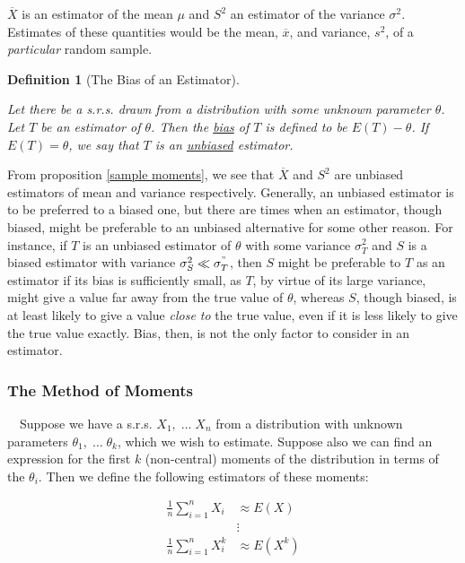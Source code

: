 \documentclass[12pt,a4paper]{article}
\newtheorem{defn}[thm]{Definition}
\begin{document}
$\overline{X}$ is an estimator of the mean $\mu$ and $S^2$ an estimator of the variance $\sigma^2$. Estimates of these quantities would be the mean, $\overline{x}$, and variance, $s^2$, of a \emph{particular} random sample.

\begin{defn}[The Bias of an Estimator]$\;$\par\vspace{1cm}

Let there be a s.r.s. drawn from a distribution with some unknown parameter $\theta$. Let $T$ be an estimator of $\theta$. Then the \underline{bias} of $T$ is defined to be $E(T) - \theta$. If $E(T) = \theta$, we say that $T$ is an \underline{unbiased} estimator.

\end{defn}

From proposition \ref{sample moments}, we see that $\overline{X}$ and $S^2$ are unbiased estimators of mean and variance respectively. Generally, an unbiased estimator is to be preferred to a biased one, but there are times when an estimator, though biased, might be preferable to an unbiased alternative for some other reason. For instance, if $T$ is an unbiased estimator of $\theta$ with some variance $\sigma_T^2$ and $S$ is a biased estimator with variance $\sigma_S^2\ll \sigma^"_T$, then $S$ might be preferable to $T$ as an estimator if its bias is sufficiently small, as $T$, by virtue of its large variance, might give a value far away from the true value of $\theta$, whereas $S$, though biased, is at least likely to give a value \emph{close to} the true value, even if it is less likely to give the true value exactly. Bias, then, is not the only factor to consider in an estimator.

\subsubsection{The Method of Moments}

$\quad$Suppose we have a s.r.s. $X_1,\;\hdots\; X_n$ from a distribution with unknown parameters $\theta_1,\;\hdots\; \theta_k$, which we wish to estimate. Suppose also we can find an expression for the first $k$ (non-central) moments of the distribution in terms of the $\theta_i$. Then we define the following estimators of these moments:

\begin{align*}
\frac{1}{n}\sum_{i=1}^n X_i &\approx E(X)\\
&\vdots\\
\frac{1}{n}\sum_{i=1}^n X_i^k &\approx E(X^k)
\end{align*}
\end{document}
